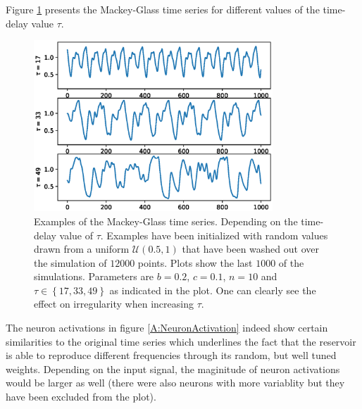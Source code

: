 \label{A:MackeyGlassESN}
Figure \ref{FIG:MackeyGlassExample} presents the Mackey-Glass time series for different values of the time-delay value $\tau$.
\begin{figure}[H]
\begin{center}
\includegraphics[width=0.8\textwidth]{Pictures/MackeyGlassExample.eps}
\end{center}
\caption{Examples of the Mackey-Glass time series. Depending on the time-delay value of $\tau$. Examples have been initialized with random values drawn from a uniform $\mathcal{U}(0.5, 1)$ that have been washed out over the simulation of $12000$ points. Plots show the last $1000$ of the simulations. Parameters are $b = 0.2$, $c = 0.1$, $n=10$ and $\tau \in \left\{17, 33, 49\right\}$ as indicated in the plot. One can clearly see the effect on irregularity when increasing $\tau$.}
\label{FIG:MackeyGlassExample}
\end{figure}

The neuron activations in figure \ref{A:NeuronActivation} indeed show certain similarities to the original time series which underlines the fact that the reservoir is able to reproduce different frequencies through its random, but well tuned weights. Depending on the input signal, the maginitude of neuron activations would be larger as well (there were also neurons with more variablity but they have been excluded from the plot).

